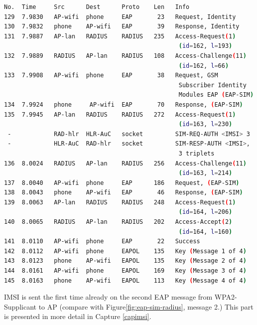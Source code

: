\documentclass[12pt,a4paper,english]{tutthesis}
\begin{document}
\begin{otherlanguage}{english}

\begin{lstlisting}[language=bash,label=eap-sim-capture,caption={Successful EAP-SIM Authentication}]
No.  Time     Src      Dest      Proto    Len   Info                                  
129  7.9830   AP-wifi  phone     EAP       23   Request, Identity                     
130  7.9832   phone    AP-wifi   EAP       39   Response, Identity                    
131  7.9887   AP-lan   RADIUS    RADIUS   235   Access-Request(1) 
                                                 (id=162, l=193)     
132  7.9889   RADIUS   AP-lan    RADIUS   108   Access-Challenge(11) 
                                                 (id=162, l=66)   
133  7.9908   AP-wifi  phone     EAP       38   Request, GSM 
                                                 Subscriber Identity 
                                                 Modules EAP (EAP-SIM)                 
134  7.9924   phone     AP-wifi  EAP       70   Response, (EAP-SIM)                 
135  7.9945   AP-lan   RADIUS    RADIUS   272   Access-Request(1)
                                                 (id=163, l=230)     
 -            RAD-hlr  HLR-AuC   socket         SIM-REQ-AUTH <IMSI> 3                 
 -            HLR-AuC  RAD-hlr   socket         SIM-RESP-AUTH <IMSI>,
                                                 3 triplets      
136  8.0024   RADIUS   AP-lan    RADIUS   256   Access-Challenge(11)
                                                 (id=163, l=214)  
137  8.0040   AP-wifi  phone     EAP      186   Request, (EAP-SIM) 
138  8.0043   phone    AP-wifi   EAP       46   Response, (EAP-SIM) 
139  8.0063   AP-lan   RADIUS    RADIUS   248   Access-Request(1)
                                                 (id=164, l=206)     
140  8.0065   RADIUS   AP-lan    RADIUS   202   Access-Accept(2)
                                                 (id=164, l=160)      
141  8.0110   AP-wifi  phone     EAP       22   Success                          
142  8.0112   AP-wifi  phone     EAPOL    135   Key (Message 1 of 4)                  
143  8.0123   phone    AP-wifi   EAPOL    135   Key (Message 2 of 4)                  
144  8.0161   AP-wifi  phone     EAPOL    169   Key (Message 3 of 4)                  
145  8.0163   phone    AP-wifi   EAPOL    113   Key (Message 4 of 4)     
\end{lstlisting}



IMSI is sent the first time already on the second EAP message from 
WPA2-Supplicant to AP (compare with Figure\ref{fig:eap-sim-radius}, message 2.)
This part is presented in more detail in Capture \ref{capimsi}.


\end{otherlanguage}
\end{document}
